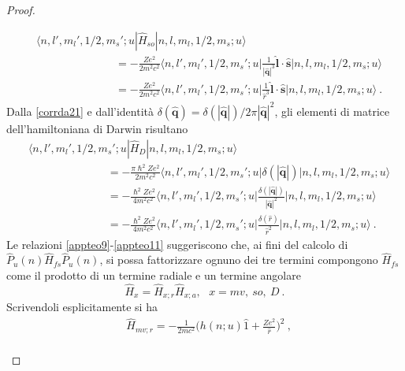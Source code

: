 \documentclass[12pt,a4paper]{report}
\numberwithin{equation}{section}
\numberwithin{section}{chapter}
\begin{document}
\begin{proof}
\begin{enumerate}[leftmargin=0pt, itemindent=2.67\parindent]
\begin{align}
		&\langle n,l',{m_l}',1/2,{m_s}';u|\widehat{H}_{so}|n,l,m_l,1/2,m_s;u\rangle\\
		&\hspace{3cm}= -\frac{Ze^2}{2m^2c^2}\bigg\langle n,l',{m_l}',1/2,{m_s}';u\bigg|\frac{1}{|\widehat{\boldsymbol{q}}|^3}\widehat{\boldsymbol{l}} \cdot \widehat{\boldsymbol{s}}\bigg|n,l,m_l,1/2,m_s;u\bigg\rangle\nonumber\\
		&\hspace{3cm}= -\frac{Ze^2}{2m^2c^2}\bigg\langle n,l',{m_l}',1/2,{m_s}';u\bigg|\frac{1}{\widehat{r}^3}\widehat{\boldsymbol{l}} \cdot \widehat{\boldsymbol{s}}\bigg|n,l,m_l,1/2,m_s;u\bigg\rangle~.\nonumber
		\end{align}
		Dalla \eqref{corrda21} e dall'identit\`a $\delta(\widehat{\boldsymbol{q}}) = \delta(|\widehat{\boldsymbol{q}}|)/2\pi|\widehat{\boldsymbol{q}}|^2$, gli elementi di matrice dell'hamiltoniana di Darwin risultano
		\begin{align}
		\label{appteo11}
		&\langle n,l',{m_l}',1/2,{m_s}';u|\widehat{H}_D|n,l,m_l,1/2,m_s;u\rangle\\
		&\hspace{3cm}= -\frac{\pi\hslash^2Ze^2}{2m^2c^2}\bigg\langle n,l',{m_l}',1/2,{m_s}';u\bigg|\delta(|\widehat{\boldsymbol{q}}|)\bigg|n,l,m_l,1/2,m_s;u\bigg\rangle\nonumber\\
		&\hspace{3cm}= -\frac{\hslash^2Ze^2}{4m^2c^2}\bigg\langle n,l',{m_l}',1/2,{m_s}';u\bigg|\frac{\delta(|\widehat{\boldsymbol{q}}|)}{|\widehat{\boldsymbol{q}}|^2}\bigg|n,l,m_l,1/2,m_s;u\bigg\rangle\nonumber\\
		&\hspace{3cm}= -\frac{\hslash^2Ze^2}{4m^2c^2}\bigg\langle n,l',{m_l}',1/2,{m_s}';u\bigg|\frac{\delta(\widehat{r})}{\widehat{r}^2}\bigg|n,l,m_l,1/2,m_s;u\bigg\rangle~.\nonumber
		\end{align}
		Le relazioni \eqref{appteo9}-\eqref{appteo11} suggeriscono che, ai fini del calcolo di $\widehat{P}_u(n)\widehat{H}_{fs}\widehat{P}_u(n)$, si possa fattorizzare ognuno dei tre termini compongono $\widehat{H}_{fs}$ come il prodotto di un termine radiale e un termine angolare
		\begin{equation}
		\label{appteo12}
		\widehat{H}_x = \widehat{H}_{x;r}\widehat{H}_{x;a},~~~x=mv,~so,~D~.
		\end{equation}
		Scrivendoli esplicitamente si ha
		\begin{align}
		&{\widehat{H}}_{mv;r} = -\frac{1}{2mc^2}\bigg(h(n;u)\widehat{1} + \frac{Ze^2}{\widehat{r}}\bigg)^2~,\label{appteo13:first}\\

\end{align}
\end{enumerate}
\end{proof}
\end{document}
